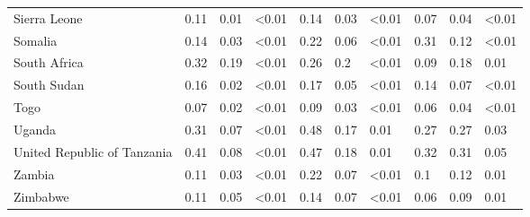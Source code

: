 \begin{longtable}[t]{llllllllll}
\addlinespace
Sierra Leone & 0.11 & 0.01 & <0.01 & 0.14 & 0.03 & <0.01 & 0.07 & 0.04 & <0.01\\
Somalia & 0.14 & 0.03 & <0.01 & 0.22 & 0.06 & <0.01 & 0.31 & 0.12 & <0.01\\
South Africa & 0.32 & 0.19 & <0.01 & 0.26 & 0.2 & <0.01 & 0.09 & 0.18 & 0.01\\
South Sudan & 0.16 & 0.02 & <0.01 & 0.17 & 0.05 & <0.01 & 0.14 & 0.07 & <0.01\\
Togo & 0.07 & 0.02 & <0.01 & 0.09 & 0.03 & <0.01 & 0.06 & 0.04 & <0.01\\
\addlinespace
Uganda & 0.31 & 0.07 & <0.01 & 0.48 & 0.17 & 0.01 & 0.27 & 0.27 & 0.03\\
United Republic of Tanzania & 0.41 & 0.08 & <0.01 & 0.47 & 0.18 & 0.01 & 0.32 & 0.31 & 0.05\\
Zambia & 0.11 & 0.03 & <0.01 & 0.22 & 0.07 & <0.01 & 0.1 & 0.12 & 0.01\\
Zimbabwe & 0.11 & 0.05 & <0.01 & 0.14 & 0.07 & <0.01 & 0.06 & 0.09 & 0.01\\*
\end{longtable}
\endgroup{}
